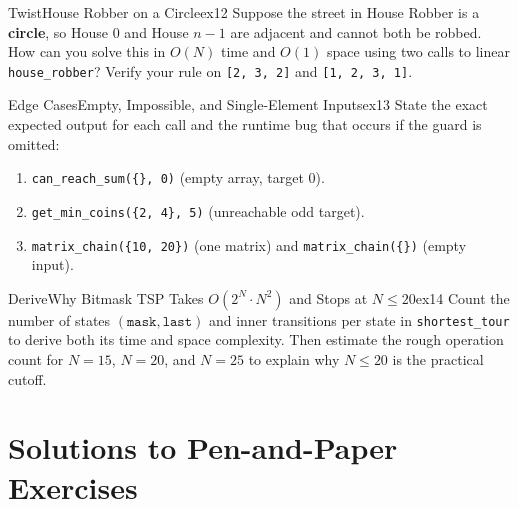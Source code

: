\documentclass[11pt,a4paper]{article}
\theoremstyle{definition}
\begin{document}
\begin{tryitbox}{Twist}{House Robber on a Circle}{ex12}
Suppose the street in House Robber is a \textbf{circle}, so House $0$ and House $n - 1$ are adjacent and cannot both be robbed. How can you solve this in $O(N)$ time and $O(1)$ space using two calls to linear \texttt{house\_robber}? Verify your rule on \texttt{[2, 3, 2]} and \texttt{[1, 2, 3, 1]}.
\end{tryitbox}

\begin{tryitbox}{Edge Cases}{Empty, Impossible, and Single-Element Inputs}{ex13}
State the exact expected output for each call and the runtime bug that occurs if the guard is omitted:
\begin{enumerate}
    \item \texttt{can\_reach\_sum(\{\}, 0)} (empty array, target $0$).
    \item \texttt{get\_min\_coins(\{2, 4\}, 5)} (unreachable odd target).
    \item \texttt{matrix\_chain(\{10, 20\})} (one matrix) and \texttt{matrix\_chain(\{\})} (empty input).
\end{enumerate}
\end{tryitbox}

\begin{tryitbox}{Derive}{Why Bitmask TSP Takes $O(2^N \cdot N^2)$ and Stops at $N \le 20$}{ex14}
Count the number of states $(\texttt{mask}, \texttt{last})$ and inner transitions per state in \texttt{shortest\_tour} to derive both its time and space complexity. Then estimate the rough operation count for $N = 15$, $N = 20$, and $N = 25$ to explain why $N \le 20$ is the practical cutoff.
\end{tryitbox}

\section*{Solutions to Pen-and-Paper Exercises}
\end{document}
